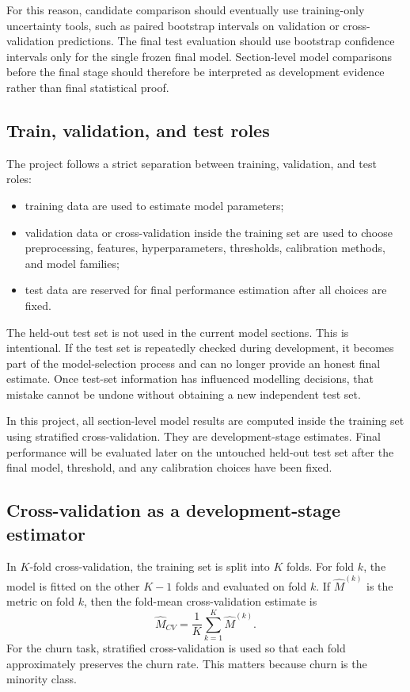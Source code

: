 For this reason, candidate comparison should eventually use training-only uncertainty tools, such as paired bootstrap intervals on validation or cross-validation predictions. The final test evaluation should use bootstrap confidence intervals only for the single frozen final model. Section-level model comparisons before the final stage should therefore be interpreted as development evidence rather than final statistical proof.

\subsection{Train, validation, and test roles}

The project follows a strict separation between training, validation, and test roles:
\begin{itemize}
    \item training data are used to estimate model parameters;
    \item validation data or cross-validation inside the training set are used to choose preprocessing, features, hyperparameters, thresholds, calibration methods, and model families;
    \item test data are reserved for final performance estimation after all choices are fixed.
\end{itemize}

The held-out test set is not used in the current model sections. This is intentional. If the test set is repeatedly checked during development, it becomes part of the model-selection process and can no longer provide an honest final estimate. Once test-set information has influenced modelling decisions, that mistake cannot be undone without obtaining a new independent test set.

In this project, all section-level model results are computed inside the training set using stratified cross-validation. They are development-stage estimates. Final performance will be evaluated later on the untouched held-out test set after the final model, threshold, and any calibration choices have been fixed.

\subsection{Cross-validation as a development-stage estimator}

In \(K\)-fold cross-validation, the training set is split into \(K\) folds. For fold \(k\), the model is fitted on the other \(K-1\) folds and evaluated on fold \(k\). If \(\widehat{M}^{(k)}\) is the metric on fold \(k\), then the fold-mean cross-validation estimate is
\[
\widehat{M}_{CV}
=
\frac{1}{K}
\sum_{k=1}^{K}
\widehat{M}^{(k)}.
\]
For the churn task, stratified cross-validation is used so that each fold approximately preserves the churn rate. This matters because churn is the minority class.

